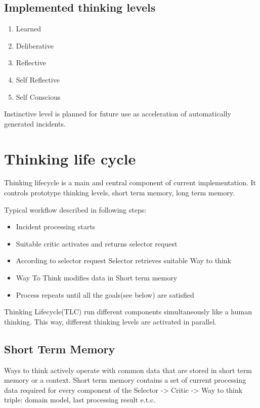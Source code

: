\documentclass[runningheads,a4paper]{llncs}
\begin{document}
\subsection{Implemented thinking levels}

\begin{enumerate}
 \item Learned
 \item Deliberative
 \item Reflective
 \item Self Reflective
 \item Self Conscious
\end{enumerate}

Instinctive level is planned for future use as acceleration of automatically generated incidents.

\section{Thinking life cycle}

Thinking lifecycle is a main and central component of current implementation. It controls prototype thinking levels, short term memory, long term memory.

Typical workflow described in following steps:

\begin{itemize}
 \item Incident processing starts
 \item Suitable critic activates and returns selector request
 \item According to selector request Selector retrieves suitable Way to think
 \item Way To Think modifies data in Short term memory
 \item Process repeats until all the goals(see below) are satisfied
\end{itemize}

Thinking Lifecycle(TLC) run different components simultaneously like a human thinking. This way, different thinking levels are activated in parallel.

\subsection{Short Term Memory}
Ways to think actively operate with common data that are stored in short term memory or a context. Short term memory contains a set of current processing data required for every component of the Selector -> Critic -> Way to think triple: domain model, last processing result e.t.c.
\end{document}
